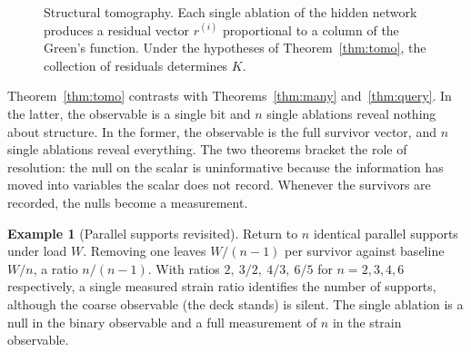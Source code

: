 \documentclass[11pt]{article}
\theoremstyle{definition}
\newtheorem{example}[theorem]{Example}
\theoremstyle{remark}
\begin{document}
\begin{figure}[ht]
\centering
{}
\caption{Structural tomography. Each single ablation of the hidden network produces a residual vector $r^{(i)}$ proportional to a column of the Green's function. Under the hypotheses of Theorem~\ref{thm:tomo}, the collection of residuals determines $K$.}
\end{figure}

Theorem~\ref{thm:tomo} contrasts with Theorems~\ref{thm:many} and~\ref{thm:query}. In the latter, the observable is a single bit and $n$ single ablations reveal nothing about structure. In the former, the observable is the full survivor vector, and $n$ single ablations reveal everything. The two theorems bracket the role of resolution: the null on the scalar is uninformative because the information has moved into variables the scalar does not record. Whenever the survivors are recorded, the nulls become a measurement.

\begin{example}[Parallel supports revisited]
Return to $n$ identical parallel supports under load $W$. Removing one leaves $W/(n-1)$ per survivor against baseline $W/n$, a ratio $n/(n-1)$. With ratios $2,\ 3/2,\ 4/3,\ 6/5$ for $n=2,3,4,6$ respectively, a single measured strain ratio identifies the number of supports, although the coarse observable (the deck stands) is silent. The single ablation is a null in the binary observable and a full measurement of $n$ in the strain observable.
\end{example}
\end{document}
